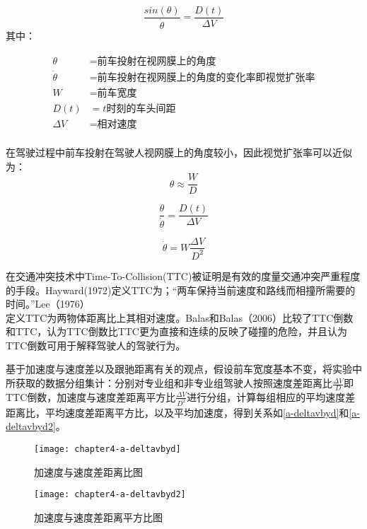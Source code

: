 \begin{equation}
\frac{sin(\theta)}{\dot{\theta}}=\frac{D(t)}{\Delta V}
\end{equation}
其中：



\begin{displaymath}
{\begin{aligned}
\theta&=\text{前车投射在视网膜上的角度}\\
\dot{\theta}&=\text{前车投射在视网膜上的角度的变化率即视觉扩张率}\\
W&=\text{前车宽度}\\
D(t)&=t\text{时刻的车头间距}\\
\Delta V&=\text{相对速度}\\
\end{aligned}}
\end{displaymath}


在驾驶过程中前车投射在驾驶人视网膜上的角度较小，因此视觉扩张率可以近似为：
\begin{equation}
\theta \approx \frac{W}{D}
\end{equation}


\begin{equation}
\frac{\theta}{\dot{\theta}}=\frac{D(t)}{\Delta V}
\end{equation}

\begin{equation}
\dot{\theta}=W\frac{\Delta V}{D^2}
\end{equation}

在交通冲突技术中Time-To-Collision(TTC)被证明是有效的度量交通冲突严重程度的手段。Hayward(1972)\cite{Hayward1972}定义TTC为；“两车保持当前速度和路线而相撞所需要的时间。”Lee（1976）\cite{Lee1976}定义TTC为两物体距离比上其相对速度。Balas和Balas（2006）\cite{Balas2006}比较了TTC倒数和TTC，认为TTC倒数比TTC更为直接和连续的反映了碰撞的危险，并且认为TTC倒数可用于解释驾驶人的驾驶行为。

基于加速度与速度差以及跟驰距离有关的观点，假设前车宽度基本不变，将实验中所获取的数据分组集计：分别对专业组和非专业组驾驶人按照速度差距离比$\frac{\Delta V}{D}$即TTC倒数，加速度与速度差距离平方比$\frac{\Delta V}{D^2}$进行分组，计算每组相应的平均速度差距离比，平均速度差距离平方比，以及平均加速度，得到关系如\autoref{a-deltavbyd}和\autoref{a-deltavbyd2}。

\begin{figure}[htbp]
\begin{minipage}[t]{0.48\linewidth}
\centering
\texttt{[image: chapter4-a-deltavbyd]}
\caption{加速度与速度差距离比图}
\label{a-deltavbyd}
\end{minipage}%
\hspace*{0.04\linewidth}
\begin{minipage}[t]{0.48\linewidth}
\centering
\texttt{[image: chapter4-a-deltavbyd2]}
\caption{加速度与速度差距离平方比图}
\label{a-deltavbyd2}
\end{minipage}
\end{figure}


